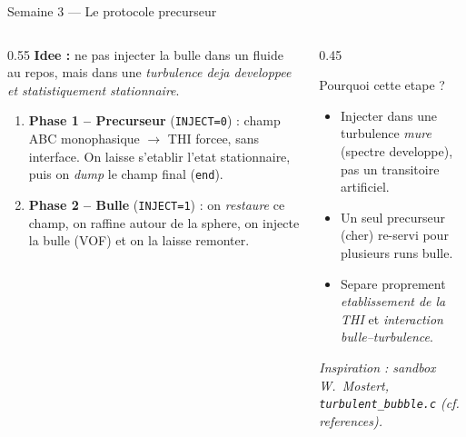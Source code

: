\documentclass[11pt,aspectratio=169]{beamer}
\begin{document}
\begin{frame}{Semaine 3 --- Le protocole \og precurseur \fg{}}
  \begin{columns}[T]
    \begin{column}{0.55\textwidth}
      \textbf{Idee :} ne pas injecter la bulle dans un fluide au repos, mais
      dans une \emph{turbulence deja developpee et statistiquement stationnaire}.
      \vspace{0.4em}
      \begin{enumerate}
        \item \textbf{Phase 1 -- Precurseur} (\texttt{INJECT=0}) :
              champ ABC monophasique $\to$ THI forcee, sans interface.
              On laisse s'etablir l'etat stationnaire, puis on \emph{dump} le
              champ final (\texttt{end}).
        \item \textbf{Phase 2 -- Bulle} (\texttt{INJECT=1}) :
              on \emph{restaure} ce champ, on raffine autour de la sphere,
              on injecte la bulle (VOF) et on la laisse remonter.
      \end{enumerate}
    \end{column}
    \begin{column}{0.45\textwidth}
      \begin{block}{Pourquoi cette etape ?}
        \footnotesize
        \begin{itemize}
          \item Injecter dans une turbulence \emph{mure} (spectre developpe), pas
                un transitoire artificiel.
          \item Un seul precurseur (cher) re-servi pour plusieurs runs bulle.
          \item Separe proprement \emph{etablissement de la THI} et
                \emph{interaction bulle--turbulence}.
        \end{itemize}
      \end{block}
      \footnotesize
      \textit{Inspiration : sandbox W.~Mostert, \texttt{turbulent\_bubble.c}
      (cf. references).}
    \end{column}
  \end{columns}
\end{frame}

\end{document}
